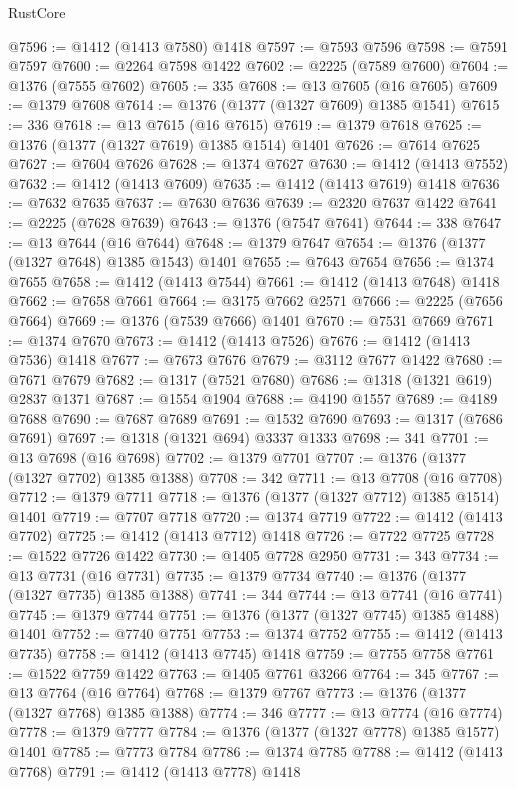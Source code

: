 \begin{lexlean}{RustCore}
\begin{coremodule}
@7596 := @1412 (@1413 @7580) @1418
@7597 := @7593 @7596
@7598 := @7591 @7597
@7600 := @2264 @7598 @1422
@7602 := @2225 (@7589 @7600)
@7604 := @1376 (@7555 @7602)
@7605 := 335
@7608 := @13 @7605 (@16 @7605)
@7609 := @1379 @7608
@7614 := @1376 (@1377 (@1327 @7609) @1385 @1541)
@7615 := 336
@7618 := @13 @7615 (@16 @7615)
@7619 := @1379 @7618
@7625 := @1376 (@1377 (@1327 @7619) @1385 @1514) @1401
@7626 := @7614 @7625
@7627 := @7604 @7626
@7628 := @1374 @7627
@7630 := @1412 (@1413 @7552)
@7632 := @1412 (@1413 @7609)
@7635 := @1412 (@1413 @7619) @1418
@7636 := @7632 @7635
@7637 := @7630 @7636
@7639 := @2320 @7637 @1422
@7641 := @2225 (@7628 @7639)
@7643 := @1376 (@7547 @7641)
@7644 := 338
@7647 := @13 @7644 (@16 @7644)
@7648 := @1379 @7647
@7654 := @1376 (@1377 (@1327 @7648) @1385 @1543) @1401
@7655 := @7643 @7654
@7656 := @1374 @7655
@7658 := @1412 (@1413 @7544)
@7661 := @1412 (@1413 @7648) @1418
@7662 := @7658 @7661
@7664 := @3175 @7662 @2571
@7666 := @2225 (@7656 @7664)
@7669 := @1376 (@7539 @7666) @1401
@7670 := @7531 @7669
@7671 := @1374 @7670
@7673 := @1412 (@1413 @7526)
@7676 := @1412 (@1413 @7536) @1418
@7677 := @7673 @7676
@7679 := @3112 @7677 @1422
@7680 := @7671 @7679
@7682 := @1317 (@7521 @7680)
@7686 := @1318 (@1321 @619) @2837 @1371
@7687 := @1554 @1904
@7688 := @4190 @1557
@7689 := @4189 @7688
@7690 := @7687 @7689
@7691 := @1532 @7690
@7693 := @1317 (@7686 @7691)
@7697 := @1318 (@1321 @694) @3337 @1333
@7698 := 341
@7701 := @13 @7698 (@16 @7698)
@7702 := @1379 @7701
@7707 := @1376 (@1377 (@1327 @7702) @1385 @1388)
@7708 := 342
@7711 := @13 @7708 (@16 @7708)
@7712 := @1379 @7711
@7718 := @1376 (@1377 (@1327 @7712) @1385 @1514) @1401
@7719 := @7707 @7718
@7720 := @1374 @7719
@7722 := @1412 (@1413 @7702)
@7725 := @1412 (@1413 @7712) @1418
@7726 := @7722 @7725
@7728 := @1522 @7726 @1422
@7730 := @1405 @7728 @2950
@7731 := 343
@7734 := @13 @7731 (@16 @7731)
@7735 := @1379 @7734
@7740 := @1376 (@1377 (@1327 @7735) @1385 @1388)
@7741 := 344
@7744 := @13 @7741 (@16 @7741)
@7745 := @1379 @7744
@7751 := @1376 (@1377 (@1327 @7745) @1385 @1488) @1401
@7752 := @7740 @7751
@7753 := @1374 @7752
@7755 := @1412 (@1413 @7735)
@7758 := @1412 (@1413 @7745) @1418
@7759 := @7755 @7758
@7761 := @1522 @7759 @1422
@7763 := @1405 @7761 @3266
@7764 := 345
@7767 := @13 @7764 (@16 @7764)
@7768 := @1379 @7767
@7773 := @1376 (@1377 (@1327 @7768) @1385 @1388)
@7774 := 346
@7777 := @13 @7774 (@16 @7774)
@7778 := @1379 @7777
@7784 := @1376 (@1377 (@1327 @7778) @1385 @1577) @1401
@7785 := @7773 @7784
@7786 := @1374 @7785
@7788 := @1412 (@1413 @7768)
@7791 := @1412 (@1413 @7778) @1418

\end{coremodule}
\end{lexlean}
